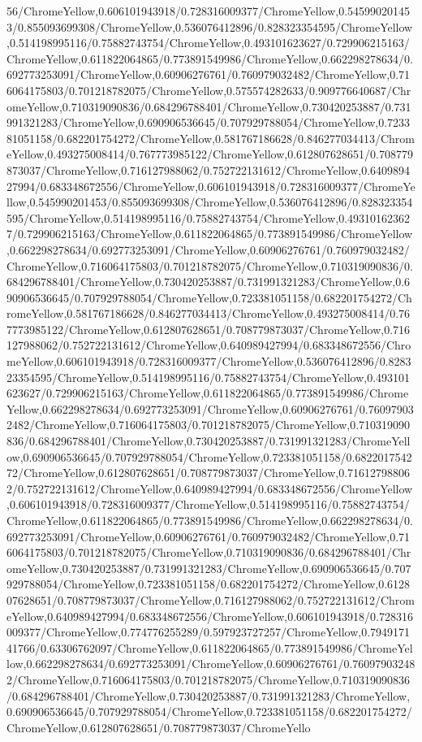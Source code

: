{\begin{tikzternal}
{56/ChromeYellow,0.606101943918/0.728316009377/ChromeYellow,0.545990201453/0.855093699308/ChromeYellow,0.536076412896/0.828323354595/ChromeYellow,0.514198995116/0.75882743754/ChromeYellow,0.493101623627/0.729906215163/ChromeYellow,0.611822064865/0.773891549986/ChromeYellow,0.662298278634/0.692773253091/ChromeYellow,0.60906276761/0.760979032482/ChromeYellow,0.716064175803/0.701218782075/ChromeYellow,0.575574282633/0.909776640687/ChromeYellow,0.710319090836/0.684296788401/ChromeYellow,0.730420253887/0.731991321283/ChromeYellow,0.690906536645/0.707929788054/ChromeYellow,0.723381051158/0.682201754272/ChromeYellow,0.581767186628/0.846277034413/ChromeYellow,0.493275008414/0.767773985122/ChromeYellow,0.612807628651/0.708779873037/ChromeYellow,0.716127988062/0.752722131612/ChromeYellow,0.640989427994/0.683348672556/ChromeYellow,0.606101943918/0.728316009377/ChromeYellow,0.545990201453/0.855093699308/ChromeYellow,0.536076412896/0.828323354595/ChromeYellow,0.514198995116/0.75882743754/ChromeYellow,0.493101623627/0.729906215163/ChromeYellow,0.611822064865/0.773891549986/ChromeYellow,0.662298278634/0.692773253091/ChromeYellow,0.60906276761/0.760979032482/ChromeYellow,0.716064175803/0.701218782075/ChromeYellow,0.710319090836/0.684296788401/ChromeYellow,0.730420253887/0.731991321283/ChromeYellow,0.690906536645/0.707929788054/ChromeYellow,0.723381051158/0.682201754272/ChromeYellow,0.581767186628/0.846277034413/ChromeYellow,0.493275008414/0.767773985122/ChromeYellow,0.612807628651/0.708779873037/ChromeYellow,0.716127988062/0.752722131612/ChromeYellow,0.640989427994/0.683348672556/ChromeYellow,0.606101943918/0.728316009377/ChromeYellow,0.536076412896/0.828323354595/ChromeYellow,0.514198995116/0.75882743754/ChromeYellow,0.493101623627/0.729906215163/ChromeYellow,0.611822064865/0.773891549986/ChromeYellow,0.662298278634/0.692773253091/ChromeYellow,0.60906276761/0.760979032482/ChromeYellow,0.716064175803/0.701218782075/ChromeYellow,0.710319090836/0.684296788401/ChromeYellow,0.730420253887/0.731991321283/ChromeYellow,0.690906536645/0.707929788054/ChromeYellow,0.723381051158/0.682201754272/ChromeYellow,0.612807628651/0.708779873037/ChromeYellow,0.716127988062/0.752722131612/ChromeYellow,0.640989427994/0.683348672556/ChromeYellow,0.606101943918/0.728316009377/ChromeYellow,0.514198995116/0.75882743754/ChromeYellow,0.611822064865/0.773891549986/ChromeYellow,0.662298278634/0.692773253091/ChromeYellow,0.60906276761/0.760979032482/ChromeYellow,0.716064175803/0.701218782075/ChromeYellow,0.710319090836/0.684296788401/ChromeYellow,0.730420253887/0.731991321283/ChromeYellow,0.690906536645/0.707929788054/ChromeYellow,0.723381051158/0.682201754272/ChromeYellow,0.612807628651/0.708779873037/ChromeYellow,0.716127988062/0.752722131612/ChromeYellow,0.640989427994/0.683348672556/ChromeYellow,0.606101943918/0.728316009377/ChromeYellow,0.774776255289/0.597923727257/ChromeYellow,0.794917141766/0.63306762097/ChromeYellow,0.611822064865/0.773891549986/ChromeYellow,0.662298278634/0.692773253091/ChromeYellow,0.60906276761/0.760979032482/ChromeYellow,0.716064175803/0.701218782075/ChromeYellow,0.710319090836/0.684296788401/ChromeYellow,0.730420253887/0.731991321283/ChromeYellow,0.690906536645/0.707929788054/ChromeYellow,0.723381051158/0.682201754272/ChromeYellow,0.612807628651/0.708779873037/ChromeYello}
\end{tikzternal}}
